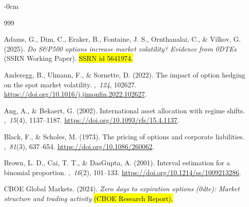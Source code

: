 \documentclass[jrfm,article,accept,moreauthors,pdftex]{Definitions/mdpi}
\begin{document}
\begin{adjustwidth}{-\extralength}{0cm}
\printendnotes[custom]



\begin{thebibliography}{999}


Adams, G., Dim, C., Eraker, B., Fontaine, J. S., Ornthanalai, C., \& Vilkov, G. (2025).
\newblock \textit{Do {S\&P500} options increase market volatility? {Evidence} from
  0{DTE}s} (SSRN Working Paper).
\newblock \hl{SSRN id 5641974.} %



Anderegg, B., Ulmann, F., \& Sornette, D. (2022).
\newblock The impact of option hedging on the spot market volatility.
,~{\em 124}, 102627.
\newblock
  \url{https://doi.org/10.1016/j.jimonfin.2022.102627}.

Ang, A., \&  Bekaert, G. (2002).
\newblock International asset allocation with regime shifts.
,~{\em 15\/}(4), 1137--1187.
\newblock
  \url{https://doi.org/10.1093/rfs/15.4.1137}.

Black, F., \& Scholes, M. (1973).
\newblock The pricing of options and corporate liabilities.
,~{\em 81\/}(3), 637--654.
\newblock
  \url{https://doi.org/10.1086/260062}.

Brown, L. D., Cai, T. T., \& DasGupta, A. (2001).
\newblock Interval estimation for a binomial proportion.
,~{\em 16\/}(2), 101--133.
\newblock
  \url{https://doi.org/10.1214/ss/1009213286}.

{CBOE Global Markets}. (2024).
\newblock \textit{Zero days to expiration options (0dte): Market structure and trading
  activity} \hl{(CBOE Research Report).} %


\end{thebibliography}
\end{adjustwidth}
\end{document}
